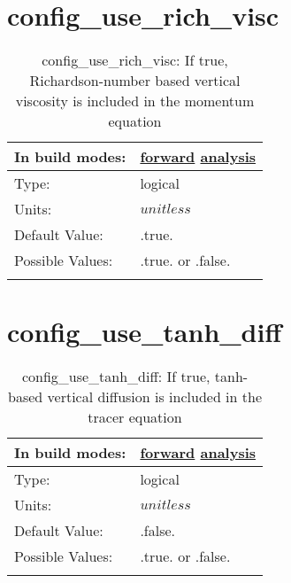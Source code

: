 \section[config\_use\_rich\_visc]{config\_use\_rich\_visc}
\label{sec:nm_sec_config_use_rich_visc}
\begin{center}
\begin{longtable}{| p{2.0in} || p{4.0in} |}
    \hline
    In build modes: & \hyperref[subsec:forward_nm_tab_vmix_rich]{forward} \hyperref[subsec:analysis_nm_tab_vmix_rich]{analysis} \\
    \hline
    Type: & logical \\
    \hline
    Units: & $unitless$ \\
    \hline
    Default Value: & .true. \\
    \hline
    Possible Values: & .true. or .false. \\
    \hline
    \caption{config\_use\_rich\_visc: If true, Richardson-number based vertical viscosity is included in the momentum equation}
\end{longtable}
\end{center}
\section[config\_use\_tanh\_diff]{config\_use\_tanh\_diff}
\label{sec:nm_sec_config_use_tanh_diff}
\begin{center}
\begin{longtable}{| p{2.0in} || p{4.0in} |}
    \hline
    In build modes: & \hyperref[subsec:forward_nm_tab_vmix_tanh]{forward} \hyperref[subsec:analysis_nm_tab_vmix_tanh]{analysis} \\
    \hline
    Type: & logical \\
    \hline
    Units: & $unitless$ \\
    \hline
    Default Value: & .false. \\
    \hline
    Possible Values: & .true. or .false. \\
    \hline
    \caption{config\_use\_tanh\_diff: If true, tanh-based vertical diffusion is included in the tracer equation}
\end{longtable}
\end{center}
